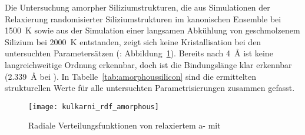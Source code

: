 \clearpage

Die Untersuchung amorpher Siliziumstrukturen, die aus Simulationen der Relaxierung randomisierter Siliziumstrukturen im kanonischen Ensemble bei \SI{1500}{\kelvin} sowie aus der Simulation einer langsamen Abkühlung von geschmolzenem Silizium bei \SI{2000}{\kelvin} entstanden, zeigt sich keine Kristallisation bei den untersuchten Parametersätzen (: Abbildung~\ref{fig:amorphousrdf}).
Bereits nach \SI{4}{\angstrom} ist keine langreichweitige Ordnung erkennbar, doch ist die Bindungslänge klar erkennbar (\SI{2.339}{\angstrom} bei ).
In Tabelle~\ref{tab:amorphoussilicon} sind die ermittelten strukturellen Werte für alle untersuchten Parametrisierungen zusammen gefasst.

\begin{figure}[H]
  \centering
  \texttt{[image: kulkarni\_rdf\_amorphous]}
  \caption[Radiale Verteilungsfunktionen von relaxiertem a-]{
    Radiale Verteilungsfunktionen von relaxiertem a- mit 
    }
  \label{fig:amorphousrdf}
\end{figure}

